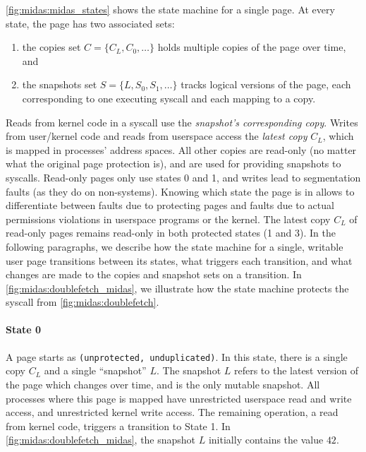 \autoref{fig:midas:midas_states} shows the state machine for a single page.
At every state, the page has two associated sets:
\begin{enumerate}
  \item the copies set $C = \{C_L, C_0, \dots\}$ holds multiple copies of the page over time, and
  \item the snapshots set $S = \{L, S_0, S_1, \dots\}$ tracks logical versions of the page, each corresponding to one executing syscall and each mapping to a copy.
\end{enumerate}
Reads from kernel code in a syscall use the \emph{snapshot's corresponding copy}.
Writes from user/kernel code and reads from userspace access the \emph{latest
copy} $C_L$, which is mapped in processes' address spaces.
All other copies are read-only (no matter what the original page protection is), and are used for providing snapshots to syscalls.
Read-only pages only use states 0 and 1, and writes lead to segmentation faults
(as they do on non-\midas systems).
Knowing which state the page is in allows \midas to differentiate between
faults due to \midas protecting pages and faults due to actual permissions
violations in userspace programs or the kernel.
The latest copy $C_L$ of read-only pages remains read-only in both
protected states (1 and 3).
In the following paragraphs, we describe how the state machine for a single,
writable user page transitions between its states, what triggers each transition,
and what changes are made to the copies and snapshot sets on a transition.
In \autoref{fig:midas:doublefetch_midas}, we illustrate how the state machine protects the
syscall from \autoref{fig:midas:doublefetch}.

\paragraph{State 0}
A page starts as \texttt{(unprotected, unduplicated)}.
In this state, there is a single copy $C_L$ and a single ``snapshot'' $L$.
The snapshot $L$ refers to the latest version of the page which changes
over time, and is the only mutable snapshot.
All processes where this page is mapped have unrestricted userspace read and write
access, and unrestricted kernel write access.
The remaining operation, a read from kernel code, triggers a transition to
State 1.
In \autoref{fig:midas:doublefetch_midas}, the snapshot $L$ initially contains
the value $42$.

